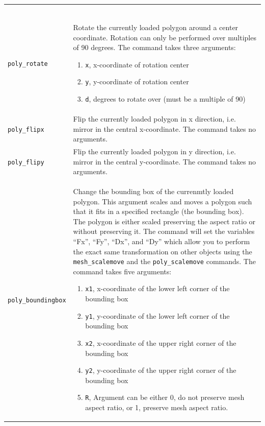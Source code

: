 \documentclass[noshowpacs,preprintnumbers,amsmath,amssymb, letter]{revtex4}
\begin{document}
\begin{longtable}{p{}p{}}
\begin{enumerate}
\end{enumerate}\\
\texttt{poly\_rotate} 	& Rotate the currently loaded polygon around a center coordinate. Rotation can only be performed over multiples of 90 degrees. The command takes three arguments:
\begin{enumerate}
\item \texttt{x}, x-coordinate of rotation center
\item \texttt{y}, y-coordinate of rotation center
\item \texttt{d}, degrees to rotate over (must be a multiple of 90)
\end{enumerate}\\
\texttt{poly\_flipx} 	& Flip the currently loaded polygon in x direction, i.e. mirror in the central x-coordinate. The command takes no arguments.\\
\texttt{poly\_flipy} 	& Flip the currently loaded polygon in y direction, i.e. mirror in the central y-coordinate. The command takes no arguments.\\
\texttt{poly\_boundingbox} 	& Change the bounding box of the currenmtly loaded polygon. This argument scales and moves a polygon such that it fits in a specified rectangle (the bounding box). The polygon is either scaled preserving the aspect ratio or without preserving it. The command will set the variables ``Fx'', ``Fy'', ``Dx'', and ``Dy'' which allow you to perform the exact same transformation on other objects using the \texttt{mesh\_scalemove} and the \texttt{poly\_scalemove} commands. The command takes five arguments:
\begin{enumerate}
\item \texttt{x1}, x-coordinate of the lower left corner of the bounding box
\item \texttt{y1}, y-coordinate of the lower left corner of the bounding box
\item \texttt{x2}, x-coordinate of the upper right corner of the bounding box
\item \texttt{y2}, y-coordinate of the upper right corner of the bounding box
\item \texttt{R}, Argument can be either 0, do not preserve mesh aspect ratio, or 1, preserve mesh aspect ratio. 

\end{enumerate}
\end{longtable}
\end{document}
